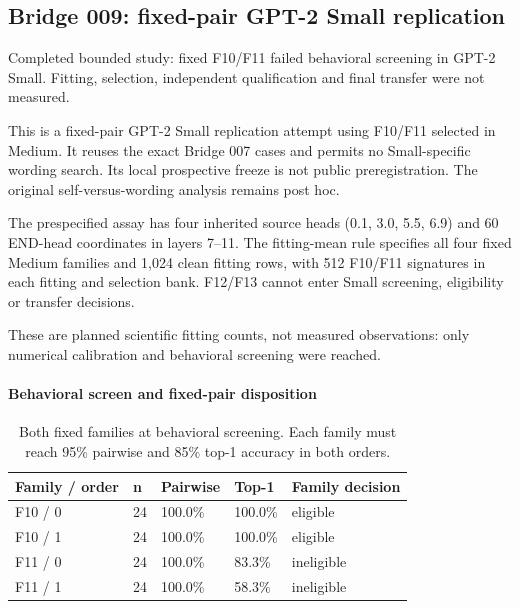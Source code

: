 \subsection*{Bridge 009: fixed-pair GPT-2 Small replication}

Completed bounded study: fixed F10/F11 failed behavioral screening in GPT-2 Small. Fitting, selection, independent qualification and final transfer were not measured.

This is a fixed-pair GPT-2 Small replication attempt using F10/F11 selected in Medium. It reuses the exact Bridge 007 cases and permits no Small-specific wording search. Its local prospective freeze is not public preregistration. The original self-versus-wording analysis remains post hoc.

The prespecified assay has four inherited source heads (0.1, 3.0, 5.5, 6.9) and 60 END-head coordinates in layers 7–11. The fitting-mean rule specifies all four fixed Medium families and 1,024 clean fitting rows, with 512 F10/F11 signatures in each fitting and selection bank. F12/F13 cannot enter Small screening, eligibility or transfer decisions.

These are planned scientific fitting counts, not measured observations: only numerical calibration and behavioral screening were reached.

\paragraph{Behavioral screen and fixed-pair disposition}

\begin{table}[htbp]
\centering\footnotesize
\caption{Both fixed families at behavioral screening. Each family must reach 95\% pairwise and 85\% top-1 accuracy in both orders.}
\label{tab:b009-screen}
\begin{tabularx}{\linewidth}{@{}YYYYY@{}}
\toprule
Family / order & n & Pairwise & Top-1 & Family decision \\
\midrule
F10 / 0 & 24 & 100.0\% & 100.0\% & eligible \\
F10 / 1 & 24 & 100.0\% & 100.0\% & eligible \\
F11 / 0 & 24 & 100.0\% & 83.3\% & ineligible \\
F11 / 1 & 24 & 100.0\% & 58.3\% & ineligible \\
\bottomrule
\end{tabularx}
\end{table}

